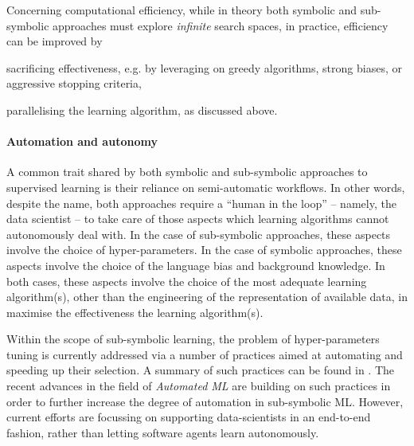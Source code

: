 \documentclass[12pt,a4paper,openright,twoside]{book}
\begin{document}
Concerning computational efficiency, while in theory both symbolic and sub-symbolic approaches must explore \emph{infinite} search spaces, in practice, efficiency can be improved by
%
\begin{inlinelist}
    \item sacrificing effectiveness, e.g. by leveraging on greedy algorithms, strong biases, or aggressive stopping criteria,
    \item parallelising the learning algorithm, as discussed above.
\end{inlinelist}


\paragraph{Automation and autonomy}


A common trait shared by both symbolic and sub-symbolic approaches to supervised learning is their reliance on semi-automatic workflows.
%
In other words, despite the name, both approaches require a ``human in the loop'' -- namely, the data scientist -- to take care of those aspects which learning algorithms cannot autonomously deal with.
%
In the case of sub-symbolic approaches, these aspects involve the choice of hyper-parameters.
%
In the case of symbolic approaches, these aspects involve the choice of the language bias and background knowledge.
%
In both cases, these aspects involve the choice of the most adequate learning algorithm(s), other than the engineering of the representation of available data, in maximise the effectiveness the learning algorithm(s).

Within the scope of sub-symbolic learning, the problem of hyper-parameters tuning is currently addressed via a number of practices aimed at automating and speeding up their selection.
%
A summary of such practices can be found in \cite{ClaesenM15}.
%
The recent advances in the field of \emph{Automated ML} \cite{HeZC21} are building on such practices in order to further increase the degree of automation in sub-symbolic ML.
%
However, current efforts are focussing on supporting data-scientists in an end-to-end fashion, rather than letting software agents learn autonomously.
\end{document}
